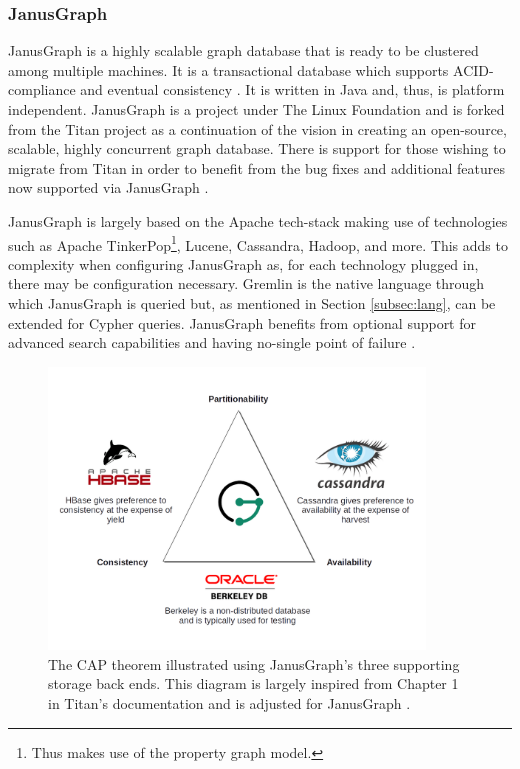 \subsubsection{JanusGraph}

JanusGraph is a highly scalable graph database that is ready to be clustered among multiple machines. It is a transactional database which supports ACID-compliance and eventual consistency \cite{janusgraph-main}. It is written in Java and, thus, is platform independent. JanusGraph is a project under The Linux Foundation and is forked from the Titan project as a continuation of the vision in creating an open-source, scalable, highly concurrent graph database. There is support for those wishing to migrate from Titan in order to benefit from the bug fixes and additional features now supported via JanusGraph \cite{janusgraph-titan}.

JanusGraph is largely based on the Apache tech-stack making use of technologies such as Apache TinkerPop\footnote{Thus makes use of the property graph model.}, Lucene, Cassandra, Hadoop, and more. This adds to complexity when configuring JanusGraph as, for each technology plugged in, there may be configuration necessary. Gremlin is the native language through which JanusGraph is queried but, as mentioned in Section \ref{subsec:lang}, can be extended for Cypher queries. JanusGraph benefits from optional support for advanced search capabilities and having no-single point of failure \cite{janusgraph-docs}.

\begin{figure}[h]
    \centering
    \includegraphics[width=10cm]{img/CAP-JanusGraph.png}
    \caption{The CAP theorem illustrated using JanusGraph's three supporting storage back ends. This diagram is largely inspired from Chapter 1 in Titan's documentation and is adjusted for JanusGraph \cite{titan-cap}.}
    \label{fig:janusgraph-cap}
\end{figure}

